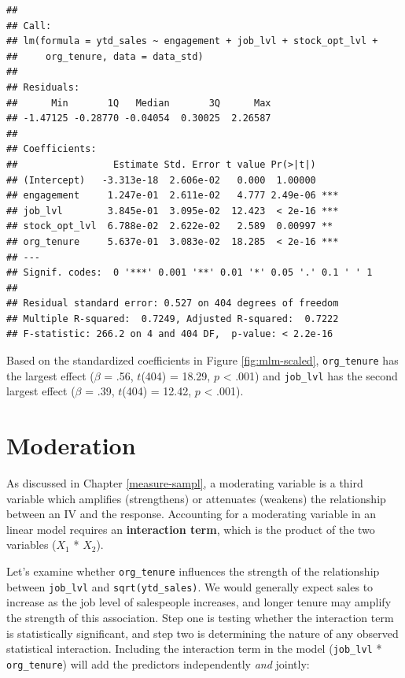 \documentclass[
]{book}
\begin{document}
\begin{verbatim}
## 
## Call:
## lm(formula = ytd_sales ~ engagement + job_lvl + stock_opt_lvl + 
##     org_tenure, data = data_std)
## 
## Residuals:
##      Min       1Q   Median       3Q      Max 
## -1.47125 -0.28770 -0.04054  0.30025  2.26587 
## 
## Coefficients:
##                 Estimate Std. Error t value Pr(>|t|)    
## (Intercept)   -3.313e-18  2.606e-02   0.000  1.00000    
## engagement     1.247e-01  2.611e-02   4.777 2.49e-06 ***
## job_lvl        3.845e-01  3.095e-02  12.423  < 2e-16 ***
## stock_opt_lvl  6.788e-02  2.622e-02   2.589  0.00997 ** 
## org_tenure     5.637e-01  3.083e-02  18.285  < 2e-16 ***
## ---
## Signif. codes:  0 '***' 0.001 '**' 0.01 '*' 0.05 '.' 0.1 ' ' 1
## 
## Residual standard error: 0.527 on 404 degrees of freedom
## Multiple R-squared:  0.7249, Adjusted R-squared:  0.7222 
## F-statistic: 266.2 on 4 and 404 DF,  p-value: < 2.2e-16
\end{verbatim}

Based on the standardized coefficients in Figure \ref{fig:mlm-scaled}, \texttt{org\_tenure} has the largest effect (\(\beta\) = .56, \(t\)(404) = 18.29, \(p\) \textless{} .001) and \texttt{job\_lvl} has the second largest effect (\(\beta\) = .39, \(t\)(404) = 12.42, \(p\) \textless{} .001).

\hypertarget{moderation}{%
\section{Moderation}\label{moderation}}

As discussed in Chapter \ref{measure-sampl}, a moderating variable is a third variable which amplifies (strengthens) or attenuates (weakens) the relationship between an IV and the response. Accounting for a moderating variable in an linear model requires an \textbf{interaction term}, which is the product of the two variables (\(X_1\) * \(X_2\)).

Let's examine whether \texttt{org\_tenure} influences the strength of the relationship between \texttt{job\_lvl} and \texttt{sqrt(ytd\_sales)}. We would generally expect sales to increase as the job level of salespeople increases, and longer tenure may amplify the strength of this association. Step one is testing whether the interaction term is statistically significant, and step two is determining the nature of any observed statistical interaction. Including the interaction term in the model (\texttt{job\_lvl} * \texttt{org\_tenure}) will add the predictors independently \emph{and} jointly:
\end{document}
